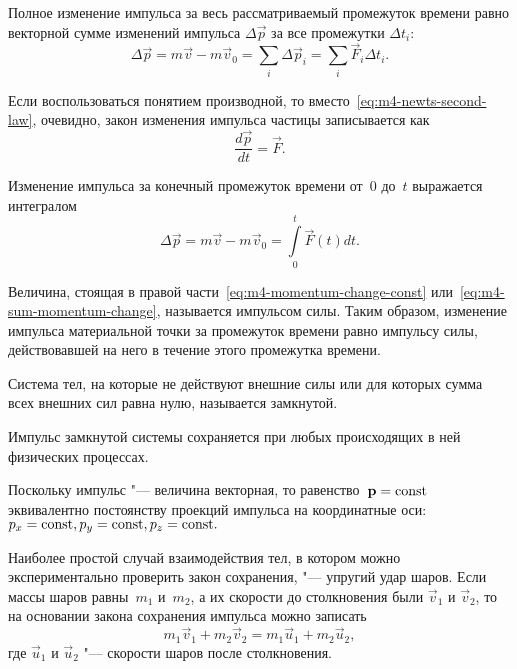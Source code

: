 \documentclass[a4paper, 12pt]{extarticle}
\newcommand{\issum}{\sum\limits_{i}}
\begin{document}
Полное изменение импульса за весь рассматриваемый промежуток времени равно векторной сумме изменений импульса $\Delta \vec p$ за все промежутки $\Delta t_i$: %
\begin{equation}
\label{eq:m4-sum-momentum-change}
\Delta \vec p = m \vec v - m \vec v_0 = \issum \Delta \vec p_i = \issum \vec F_i \Delta t_i.
\end{equation}

Если воспользоваться понятием производной, то вместо~\eqref{eq:m4-newts-second-law}, очевидно, закон изменения импульса частицы записывается как
\begin{equation}
\label{eq:m4-momentum-change-via-drvt}
\frac{d \vec p}{d t} = \vec F .
\end{equation}

Изменение импульса за конечный промежуток времени от~0 до~$t$ выражается интегралом
\begin{equation}
\label{eq:m4-total-momentum-change-via-int}
\Delta \vec p = m \vec v - m \vec v_0 = \int\limits_0^t \vec F(t) d t.
\end{equation}

Величина, стоящая в правой части~\eqref{eq:m4-momentum-change-const} или~\eqref{eq:m4-sum-momentum-change}, называется импульсом силы. Таким образом, изменение импульса материальной точки за промежуток времени равно импульсу силы, действовавшей на него в течение этого промежутка времени.

Система тел, на которые не действуют внешние силы или для которых сумма всех внешних сил равна нулю, называется замкнутой.

Импульс замкнутой системы сохраняется при любых происходящих в ней физических процессах.

Поскольку импульс "--- величина векторная, то равенство~$\mathbf{p} = \textrm{const}$ эквивалентно постоянству проекций импульса на координатные оси: $p_x = \textrm{const}, p_y = \textrm{const}, p_z = \textrm{const}.$  

Наиболее простой случай взаимодействия тел, в котором можно экспериментально проверить закон сохранения, "--- упругий удар шаров. Если массы шаров равны~$m_1$ и~$m_2$, а их скорости до столкновения были $\vec v_1$ и $\vec v_2$, то на основании закона сохранения импульса можно записать
\begin{equation}
\label{eq:m4-balls-collision}
m_1 \vec v_1 + m_2 \vec v_2 = m_1 \vec u_1 + m_2 \vec u_2,
\end{equation}
где $\vec u_1$ и $\vec u_2$ "--- скорости шаров после столкновения.
\end{document}
